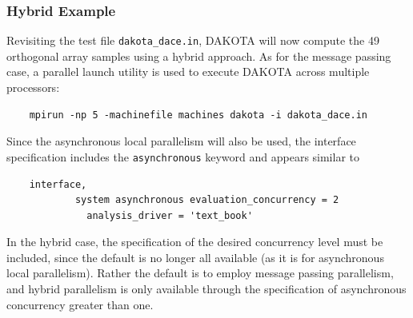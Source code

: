 \subsubsection{Hybrid Example}\label{parallel:SLP:hybrid:ex}

Revisiting the test file \texttt{dakota\_dace.in}, DAKOTA will now
compute the 49 orthogonal array samples using a hybrid approach.  As
for the message passing case, a parallel launch utility is used to
execute DAKOTA across multiple processors:
\begin{small}
\begin{verbatim}
    mpirun -np 5 -machinefile machines dakota -i dakota_dace.in
\end{verbatim}
\end{small}

Since the asynchronous local parallelism will also be used, the
interface specification includes the \texttt{asynchronous}
keyword and appears similar to
\begin{small}
\begin{verbatim}
    interface,
            system asynchronous evaluation_concurrency = 2
              analysis_driver = 'text_book'
\end{verbatim}
\end{small}
In the hybrid case, the specification of the desired concurrency level
must be included, since the default is no longer all available (as it
is for asynchronous local parallelism).  Rather the default is to employ
message passing parallelism, and hybrid parallelism is only available
through the specification of asynchronous concurrency greater than one.


